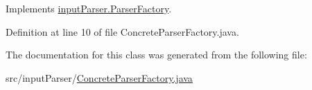 Implements \hyperlink{classinput_parser_1_1_parser_factory_a3c9d82a4912ea351eefd5d943d5af35c}{input\-Parser.\-Parser\-Factory}.



Definition at line 10 of file Concrete\-Parser\-Factory.\-java.



The documentation for this class was generated from the following file\-:\begin{DoxyCompactItemize}
\item 
src/input\-Parser/\hyperlink{_concrete_parser_factory_8java}{Concrete\-Parser\-Factory.\-java}\end{DoxyCompactItemize}
